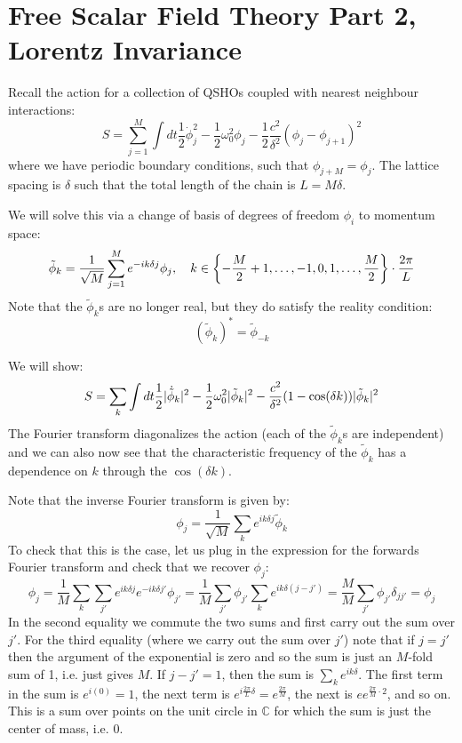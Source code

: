 \section{Free Scalar Field Theory Part 2, Lorentz Invariance}
Recall the action for a collection of QSHOs coupled with nearest neighbour interactions:
\begin{equation}
    S = \sum_{j=1}^M \int dt \frac{1}{2}\dot{\phi}_j^2 - \frac{1}{2}\omega_0^2\phi_j - \frac{1}{2}\frac{c^2}{\delta^2}\left(\phi_j - \phi_{j+1}\right)^2
\end{equation}
where we have periodic boundary conditions, such that $\phi_{j+M} = \phi_j$. The lattice spacing is $\delta$ such that the total length of the chain is $L = M\delta$.

We will solve this via a change of basis of degrees of freedom $\phi_i$ to momentum space:
\begin{equation}
    \tilde{\phi}_k = \frac{1}{\sqrt{M}}\sum_{j=1}^M e^{-ik\delta j}\phi_j, \quad k \in \set{-\frac{M}{2} + 1, \ldots, -1, 0, 1, \ldots, \frac{M}{2}} \cdot \frac{2\pi}{L}
\end{equation}
Note that the $\tilde{\phi}_k$s are no longer real, but they do satisfy the reality condition:
\begin{equation}
    (\tilde{\phi}_k)^* = \tilde{\phi}_{-k}
\end{equation}

We will show:
\begin{equation}\label{eq:actionmomentumspace}
    S = \sum_k \int dt \frac{1}{2}\lvert \dot{\tilde{\phi}}_k \rvert^2 - \frac{1}{2}\omega_0^2\lvert \tilde{\phi}_k \rvert^2 - \frac{c^2}{\delta^2}(1 - \cos(\delta k))\lvert \tilde{\phi}_k \rvert^2
\end{equation}
The Fourier transform diagonalizes the action (each of the $\tilde{\phi}_k$s are independent) and we can also now see that the characteristic frequency of the $\tilde{\phi}_k$ has a dependence on $k$ through the $\cos(\delta k)$. 

Note that the inverse Fourier transform is given by:
\begin{equation}
    \phi_j = \frac{1}{\sqrt{M}}\sum_k e^{ik\delta j}\tilde{\phi}_k
\end{equation}
To check that this is the case, let us plug in the expression for the forwards Fourier transform and check that we recover $\phi_j$:
\begin{equation}
    \phi_j = \frac{1}{M}\sum_k \sum_{j'}e^{ik\delta j}e^{-ik\delta j'}\phi_{j'} = \frac{1}{M}\sum_{j'}\phi_{j'}\sum_k e^{ik\delta(j - j')} = \frac{M}{M}\sum_{j'}\phi_{j'}\delta_{jj'} = \phi_j
\end{equation}
In the second equality we commute the two sums and first carry out the sum over $j'$. For the third equality (where we carry out the sum over $j'$) note that if $j = j'$ then the argument of the exponential is zero and so the sum is just an $M$-fold sum of 1, i.e. just gives $M$. If $j - j' = 1$, then the sum is $\sum_k e^{ik\delta}$. The first term in the sum is $e^{i(0)} = 1$, the next term is $e^{i\frac{2\pi}{L}\delta} = e^{\frac{2\pi}{M}}$, the next is $ee^{\frac{2\pi}{M}\cdot 2}$, and so on. This is a sum over points on the unit circle in $\mathbb{C}$ for which the sum is just the center of mass, i.e. 0. 

